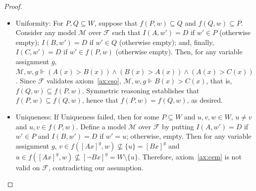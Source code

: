 \documentclass[12pt]{article}
\newcommand{\tup}[1]{\langle #1 \rangle}
\newcommand{\would}{\mathbin{>}}
\begin{document}
\begin{proof}
\begin{itemize}
        \item Uniformity: For $P, Q \subseteq W$, suppose that $f(P,w) \subseteq Q$ and $f(Q,w) \subseteq P$. 
        Consider any model $\mathcal{M}$ over $\mathcal{F}$ such that $I(A,w') = D$ if $w' \in P$ (otherwise empty); $I(B,w') = D$ if $w' \in Q$ (otherwise empty); and, finally, $I(C,w') = D$ if $w'\in f(P,w)$ (otherwise empty). 
        Then, for any variable assignment $g$, $\mathcal{M},w,g \Vdash (A(x) \would B(x)) \wedge (B(x) \would A(x)) \wedge (A(x) \would C(x))$. 
        Since $\mathcal{F}$ validates axiom~\ref{ax:cso}, $\mathcal{M},w,g \Vdash B(x) \would C(x)$, that is, $f(Q,w) \subseteq f(P,w)$. 
        Symmetric reasoning establishes that $f(P,w) \subseteq f(Q,w)$, hence that $f(P,w) = f(Q,w)$, as desired.
        

        \item Uniqueness: If Uniqueness failed, then for some $P\subseteq{W}$ and $u, v, w \in W$, $u\neq{v}$ and $u, v \in f(P,w)$. Define a model $\mathcal{M}$ over $\mathcal{F}$ by putting $I(A,w')=D$ if $w'\in P$ and $I(B,w')=D$ if $w'=u$; otherwise, empty. Then for any variable assignment $g$, $v\in f([Ax]^{g},w)\not\subseteq\{u\}=[Bx]^{g}$ and $u\in f([Ax]^{g},w)\not\subseteq [\neg{Bx}]^{g} = W\setminus\{u\}$. Therefore, axiom~\ref{ax:cem} is not valid on $\mathcal{F}$, contradicting our assumption.
    \end{itemize}
\end{proof}
\end{document}
